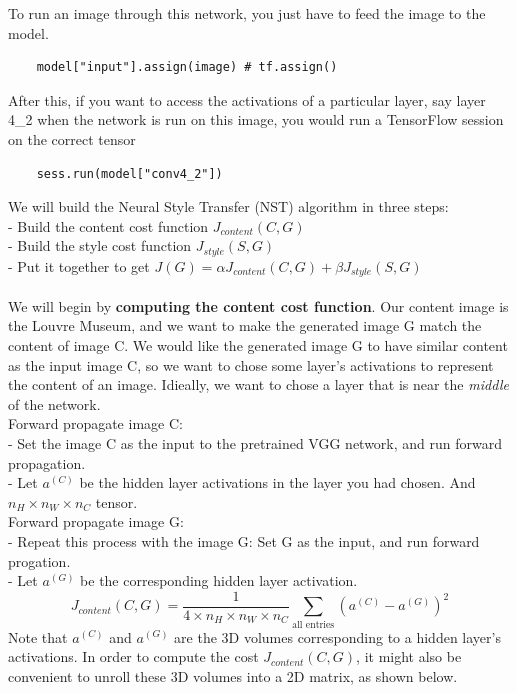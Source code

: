\documentclass[11pt, a4paper]{article}
\begin{document}
\begin{spacing}{1.1}
	\noindent To run an image through this network, you just have to feed the image to the model.
	\begin{lstlisting} 
	model["input"].assign(image) # tf.assign() \end{lstlisting} \vspace*{1mm}
	After this, if you want to access the activations of a particular layer, say layer 4\_2 when the network is run on this image, you would run a TensorFlow session on the correct tensor 
	\begin{lstlisting}
	sess.run(model["conv4_2"]) \end{lstlisting} \vspace*{1mm}
	We will build the Neural Style Transfer (NST) algorithm in three steps:\\
	- Build the content cost function $J_{content}(C,G)$ \\
	- Build the style cost function $J_{style}(S,G)$ \\
	- Put it together to get $J(G) = \alpha J_{content}(C,G) + \beta J_{style}(S,G)$ \\~\\
	We will begin by \textbf{computing the content cost function}. Our content image is the Louvre Museum, and we want to make the generated image G match the content of image C. We would like the generated image G to have similar content as the input image C, so we want to chose some layer's activations to represent the content of an image. Idieally, we want to chose a layer that is near the \textit{middle} of the network. \vspace*{1mm}\\
	Forward propagate image C:\\
	- Set the image C as the input to the pretrained VGG network, and run forward propagation.\\  
	- Let $a^{(C)}$ be the hidden layer activations in the layer you had chosen. And $n_H \times n_W \times n_C$ tensor. \vspace*{1mm}\\
	Forward propagate image G: \\
	- Repeat this process with the image G: Set G as the input, and run forward progation. \\
	- Let $a^{(G)}$ be the corresponding hidden layer activation. \\
	$$J_{content}(C,G) =  \frac{1}{4 \times n_H \times n_W \times n_C}\sum _{ \text{all entries}} (a^{(C)} - a^{(G)})^2 $$
	Note that $a^{(C)}$ and $a^{(G)}$ are the 3D volumes corresponding to a hidden layer's activations. In order to compute the cost $J_{content}(C,G)$, it might also be convenient to unroll these 3D volumes into a 2D matrix, as shown below.

\end{spacing}
\end{document}
